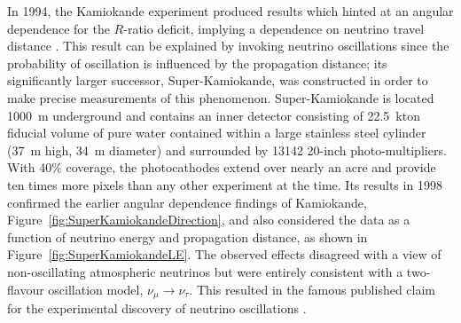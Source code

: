 In 1994, the Kamiokande experiment produced results which hinted at an angular dependence for the $R$-ratio deficit, implying a dependence on neutrino travel distance \cite{Kamiokande1994}.  This result can be explained by invoking neutrino oscillations since the probability of oscillation is influenced by the propagation distance; its significantly larger successor, Super-Kamiokande, was constructed in order to make precise measurements of this phenomenon.  Super-Kamiokande is located 1000~m underground and contains an inner detector consisting of 22.5~kton fiducial volume of pure water contained within a large stainless steel cylinder (37~m high, 34~m diameter) and surrounded by 13142 20-inch photo-multipliers.  With 40\% coverage, the photocathodes extend over nearly an acre and provide ten times more pixels than any other experiment at the time.  Its results in 1998 confirmed the earlier angular dependence findings of Kamiokande, Figure~\ref{fig:SuperKamiokandeDirection}, and also considered the data as a function of neutrino energy and propagation distance, as shown in Figure~\ref{fig:SuperKamiokandeLE}.  The observed effects disagreed with a view of non-oscillating atmospheric neutrinos but were entirely consistent with a two-flavour oscillation model, $\nu_{\mu} \rightarrow \nu_{\tau}$.  This resulted in the famous published claim for the experimental discovery of neutrino oscillations \cite{SuperKamiokande1998}.

